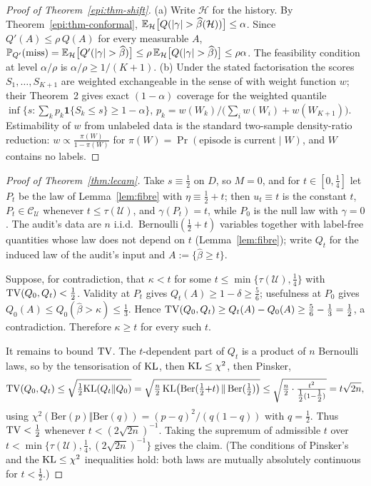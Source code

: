 \begin{proof}[Proof of Theorem~\ref{epi:thm-shift}]
(a) Write $\mathcal H$ for the history. By Theorem~\ref{epi:thm-conformal},
$\E_{\mathcal H}\bigl[Q(|\gamma|>\widehat\beta(\mathcal H))\bigr]\le\alpha$. Since
$Q'(A)\le\rho\,Q(A)$ for every measurable $A$,
$\Pr_{Q'}(\text{miss})=\E_{\mathcal H}\bigl[Q'(|\gamma|>\widehat\beta)\bigr]
\le\rho\,\E_{\mathcal H}\bigl[Q(|\gamma|>\widehat\beta)\bigr]\le\rho\alpha$. The feasibility
condition at level $\alpha/\rho$ is $\alpha/\rho\ge1/(K+1)$.
(b) Under the stated factorisation the scores $S_1,\dots,S_{K+1}$ are weighted exchangeable in the
sense of \cite{tibshirani2019conformal} with weight function $w$; their Theorem~2 gives exact
$(1-\alpha)$ coverage for the weighted quantile
$\inf\{s:\sum_k p_k\mathbf 1\{S_k\le s\}\ge1-\alpha\}$,
$p_k=w(W_k)/\bigl(\sum_i w(W_i)+w(W_{K+1})\bigr)$. Estimability of $w$ from unlabeled data is the
standard two-sample density-ratio reduction: $w\propto\frac{\pi(W)}{1-\pi(W)}$ for
$\pi(W)=\Pr(\text{episode is current}\mid W)$, and $W$ contains no labels.
\end{proof}

\begin{proof}[Proof of Theorem~\ref{thm:lecam}]
Take $s\equiv\tfrac12$ on $D$, so $M=0$, and for $t\in[0,\tfrac14]$ let $P_t$ be the law of
Lemma~\ref{lem:fibre} with $\eta\equiv\tfrac12+t$; then $u_t\equiv t$ is the constant $t$,
$P_t\in\mathcal C_{\mathcal U}$ whenever $t\le\tau(\mathcal U)$, and $\gamma(P_t)=t$, while
$P_0$ is the null law with $\gamma=0$. The audit's data are $n$ i.i.d.\
$\mathrm{Bernoulli}(\tfrac12+t)$ variables together with label-free quantities whose law does
not depend on $t$ (Lemma~\ref{lem:fibre}); write $Q_t$ for the induced law of the audit's
input and $A:=\{\widehat\beta\ge t\}$.

Suppose, for contradiction, that $\kappa<t$ for some $t\le\min\{\tau(\mathcal U),\tfrac14\}$
with $\mathrm{TV}(Q_0,Q_t)<\tfrac12$. Validity at $P_t$ gives $Q_t(A)\ge1-\delta\ge\tfrac56$;
usefulness at $P_0$ gives $Q_0(A)\le Q_0(\widehat\beta>\kappa)\le\tfrac13$. Hence
$\mathrm{TV}(Q_0,Q_t)\ge Q_t(A)-Q_0(A)\ge\tfrac56-\tfrac13=\tfrac12$, a contradiction. Therefore
$\kappa\ge t$ for every such $t$.

It remains to bound $\mathrm{TV}$. The $t$-dependent part of $Q_t$ is a product of $n$ Bernoulli laws,
so by the tensorisation of $\mathrm{KL}$, then $\mathrm{KL}\le\chi^2$, then Pinsker,
\[
\mathrm{TV}(Q_0,Q_t)\le\sqrt{\tfrac12\mathrm{KL}(Q_t\Vert Q_0)}
=\sqrt{\tfrac{n}{2}\,\mathrm{KL}\bigl(\mathrm{Ber}(\tfrac12{+}t)\,\Vert\,\mathrm{Ber}(\tfrac12)\bigr)}
\le\sqrt{\tfrac{n}{2}\cdot\tfrac{t^2}{\tfrac12(1-\tfrac12)}}=t\sqrt{2n},
\]
using $\chi^2(\mathrm{Ber}(p)\Vert\mathrm{Ber}(q))=(p-q)^2/(q(1-q))$ with $q=\tfrac12$. Thus
$\mathrm{TV}<\tfrac12$ whenever $t<(2\sqrt{2n})^{-1}$. Taking the supremum of admissible $t$ over
$t<\min\{\tau(\mathcal U),\tfrac14,(2\sqrt{2n})^{-1}\}$ gives the claim.
(The conditions of Pinsker's and the $\mathrm{KL}\le\chi^2$ inequalities hold: both laws are
mutually absolutely continuous for $t<\tfrac12$.)
\end{proof}

